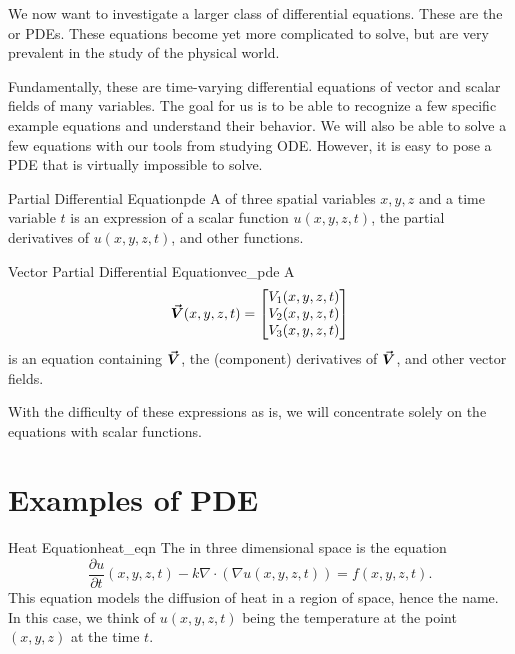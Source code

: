 
        We now want to investigate a larger class of differential equations.  These are the  or PDEs.  These equations become yet more complicated to solve, but are very prevalent in the study of the physical world.
        
        Fundamentally, these are time-varying differential equations of vector and scalar fields of many variables.  The goal for us is to be able to recognize a few specific example equations and understand their behavior.  We will also be able to solve a few equations with our tools from studying ODE. However, it is easy to pose a PDE that is virtually impossible to solve.  
        
        \begin{df}{Partial Differential Equation}{pde}
        A  of three spatial variables $x,y,z$ and a time variable $t$ is an expression of a scalar function $u(x,y,z,t)$, the partial derivatives of $u(x,y,z,t)$, and other functions.
        \end{df}
        
        \begin{df}{Vector Partial Differential Equation}{vec_pde}
        A 
        \[
        \boldsymbol{\vec{V}}(x,y,z,t) = \begin{bmatrix} V_1(x,y,z,t) \\ V_2(x,y,z,t) \\ V_3(x,y,z,t) \end{bmatrix}
        \]
        is an equation containing $\boldsymbol{\vec{V}}$, the (component) derivatives of $\boldsymbol{\vec{V}}$, and other vector fields.
        \end{df}
        
        With the difficulty of these expressions as is, we will concentrate solely on the equations with scalar functions.
    
        \section{Examples of PDE}
        
        \begin{ex}{Heat Equation}{heat_eqn}
        The  in three dimensional space is the equation
        \[
        \frac{\partial u}{\partial t}(x,y,z,t) -k\nabla \cdot (\nabla u(x,y,z,t)) = f(x,y,z,t).
        \]
        This equation models the diffusion of heat in a region of space, hence the name.  In this case, we think of $u(x,y,z,t)$ being the temperature at the point $(x,y,z)$ at the time $t$.
        \end{ex}
        
